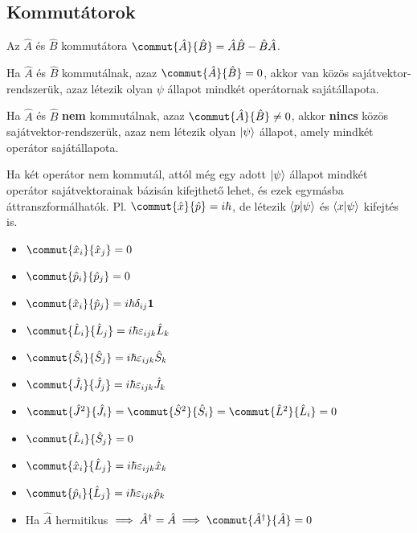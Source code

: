\subsection{Kommutátorok}
\begin{def*}
    Az $\hat A$ és $\hat B$ kommutátora $\commut{\hat A}{\hat B} = \hat A \hat B - \hat B \hat A$. 
\end{def*}
\begin{theorem*}
    Ha $\hat A$ és $\hat B$ kommutálnak, azaz $\commut{\hat A}{\hat B} = 0$, akkor van közös sajátvektor-rendszerük, azaz létezik olyan
    $\psi$ állapot mindkét operátornak sajátállapota.
\end{theorem*}
\begin{theorem*}
    Ha $\hat A$ és $\hat B$ \textbf{nem} kommutálnak, azaz $\commut{\hat A}{\hat B} \neq 0$, akkor \textbf{nincs} közös sajátvektor-rendszerük, azaz nem 
    létezik olyan $\ket\psi$ állapot, amely mindkét operátor sajátállapota.
\end{theorem*}
\begin{megj}
    Ha két operátor nem kommutál, attól még egy adott $\ket\psi$ állapot mindkét operátor sajátvektorainak bázisán kifejthető lehet,
    és ezek egymásba áttranszformálhatók. Pl. $\commut{\hat x}{\hat p} = i\hbar$, de létezik $\braket{p|\psi}$ és $\braket{x|\psi}$
    kifejtés is.
\end{megj}
\begin{itemize}
    \item $\commut{\hat x_i}{\hat x_j} = 0$
    \item $\commut{\hat p_i}{\hat p_j} = 0$
    \item $\commut{\hat x_i}{\hat p_j} = i\hbar \delta_{ij}\mathbf 1$
    \item $\commut{\hat L_i}{\hat L_j} = i \hbar \varepsilon_{ijk}\hat L_k$
    \item $\commut{\hat S_i}{\hat S_j} = i \hbar \varepsilon_{ijk}\hat S_k$
    \item $\commut{\hat J_i}{\hat J_j} = i \hbar \varepsilon_{ijk}\hat J_k$
    \item $\commut{\hat J^2}{\hat J_i} = \commut{\hat S^2}{\hat S_i} = \commut{\hat L^2}{\hat L_i} = 0$
    \item $\commut{\hat L_i}{\hat S_j} = 0$
    \item $\commut{\hat x_i}{\hat L_j} = i \hbar \varepsilon_{ijk}\hat x_k$
    \item $\commut{\hat p_i}{\hat L_j} = i \hbar \varepsilon_{ijk}\hat p_k$    
    \item Ha $\hat A$ hermitikus $\implies \hat A^\dag = \hat A \implies \commut{\hat A^\dag}{\hat A} = 0$  
    
    
\end{itemize}
